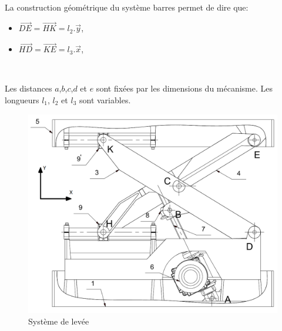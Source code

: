 ~\

La construction géométrique du système  barres \fg permet de dire que:
\begin{itemize}
 \item $\overrightarrow{DE}=\overrightarrow{HK}=l_2.\overrightarrow{y}$,
 \item $\overrightarrow{HD}=\overrightarrow{KE}=l_3.\overrightarrow{x}$,
\end{itemize}

~\

Les distances $a$,$b$,$c$,$d$ et $e$ sont fixées par les dimensions du mécanisme. Les longueurs $l_1$, $l_2$ et $l_3$ sont variables.
 
\begin{figure}[htbp]
\begin{center}
\includegraphics[width=\linewidth]{img/face.png}
\caption{Système de levée}
\label{fig:imagechaise7}
\end{center}
\end{figure}

